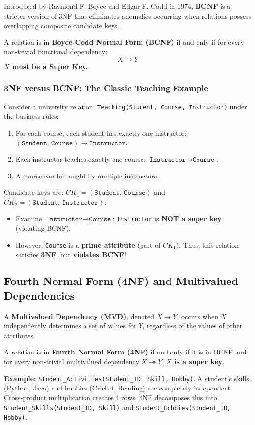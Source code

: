 Introduced by Raymond F. Boyce and Edgar F. Codd in 1974, \textbf{BCNF} is a stricter version of 3NF that eliminates anomalies occurring when relations possess overlapping composite candidate keys.

\begin{tcolorbox}[colback=white,colframe=black,title=\textbf{BCNF Definition}]
A relation is in \textbf{Boyce-Codd Normal Form (BCNF)} if and only if for every non-trivial functional dependency:
\[ X \rightarrow Y \]
\textbf{$X$ must be a Super Key.}
\end{tcolorbox}

\subsubsection{3NF versus BCNF: The Classic Teaching Example}

Consider a university relation: \texttt{Teaching(Student, Course, Instructor)} under the business rules:
\begin{enumerate}
\item For each course, each student has exactly one instructor: $(\texttt{Student, Course}) \rightarrow \texttt{Instructor}$.
\item Each instructor teaches exactly one course: $\texttt{Instructor} \rightarrow \texttt{Course}$.
\item A course can be taught by multiple instructors.
\end{enumerate}
Candidate keys are: $CK_1 = (\texttt{Student, Course})$ and $CK_2 = (\texttt{Student, Instructor})$.
\begin{itemize}
\item Examine $\texttt{Instructor} \rightarrow \texttt{Course}$: \texttt{Instructor} is \textbf{NOT a super key} (violating BCNF).
\item However, \texttt{Course} is a \textbf{prime attribute} (part of $CK_1$). Thus, this relation satisfies \textbf{3NF}, but \textbf{violates BCNF}!
\end{itemize}

\subsection{Fourth Normal Form (4NF) and Multivalued Dependencies}

A \textbf{Multivalued Dependency (MVD)}, denoted $X \twoheadrightarrow Y$, occurs when $X$ independently determines a set of values for $Y$, regardless of the values of other attributes.
\begin{tcolorbox}[colback=white,colframe=black,title=\textbf{4NF Definition}]
A relation is in \textbf{Fourth Normal Form (4NF)} if and only if it is in BCNF and for every non-trivial multivalued dependency $X \twoheadrightarrow Y$, \textbf{$X$ is a super key}.
\end{tcolorbox}
\textbf{Example:} \texttt{Student\_Activities(Student\_ID, Skill, Hobby)}. A student's skills (Python, Java) and hobbies (Cricket, Reading) are completely independent. Cross-product multiplication creates 4 rows. 4NF decomposes this into \texttt{Student\_Skills(Student\_ID, Skill)} and \texttt{Student\_Hobbies(Student\_ID, Hobby)}.

